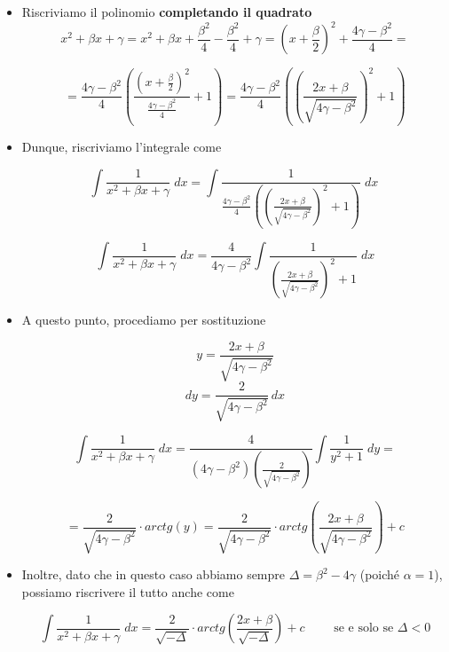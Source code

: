 \documentclass[a4paper, 12pt]{report}
\begin{document}
\begin{enumerate}
\begin{enumerate}
\begin{itemize}
                \item Riscriviamo il polinomio \textbf{completando il quadrato}
                \[ x^2 + \beta x + \gamma = x^2 + \beta x + \frac{\beta^2}{4} - \frac{\beta^2}{4} + \gamma = \left ( x + \frac{\beta}{2} \right )^2 + \frac{4 \gamma - \beta^2}{4} = \]
                
                \[ = \frac{4 \gamma - \beta^2}{4} \left ( \frac{ \left ( x + \frac{\beta}{2} \right )^2}{\frac{4 \gamma - \beta^2}{4}}  + 1 \right ) =
                \frac{4 \gamma - \beta^2}{4} \left ( \left ( \frac{2x+ \beta}{\sqrt{4 \gamma-\beta^2}} \right )^2  + 1 \right )\]
                
                    \item Dunque, riscriviamo l'integrale come
                    
                    \[ \int \frac{1}{x^2 + \beta x + \gamma} \; dx = \int \frac{1}{\frac{4 \gamma - \beta^2}{4} \left ( \left ( \frac{2x+ \beta}{\sqrt{4 \gamma-\beta^2}} \right )^2  + 1 \right )} \; dx\ \]
                    
                \[ \int \frac{1}{x^2 + \beta x + \gamma} \; dx = \frac{4}{4 \gamma - \beta^2} \int \frac{1}{\left (\frac{2x+ \beta}{\sqrt{4 \gamma-\beta^2}} \right )^2  + 1} \; dx \]
                
                \item A questo punto, procediamo per sostituzione
                
                \[ y = \frac{2x+ \beta}{\sqrt{4 \gamma-\beta^2}} \]
                \[ dy = \frac{2}{\sqrt{4 \gamma-\beta^2}} \, dx \]
                
                \[ \int \frac{1}{x^2 + \beta x + \gamma} \; dx = \frac{4}{(4 \gamma - \beta^2)\left ( \frac{2}{\sqrt{4 \gamma-\beta^2}} \right )} \int \frac{1}{y^2 + 1}\; dy= \]
                
                \[ = \frac{2}{\sqrt{4 \gamma - \beta^2}}  \cdot arctg(y) = \frac{2}{\sqrt{4 \gamma - \beta^2}} \cdot arctg \left ( \frac{2x+ \beta}{\sqrt{4 \gamma-\beta^2}}\right )+c\]
                
                \item Inoltre, dato che in questo caso abbiamo sempre $\Delta = \beta^2 - 4 \gamma$ (poiché $\alpha = 1$), possiamo riscrivere il tutto anche come
                
                \[ \int \frac{1}{x^2 + \beta x + \gamma} \; dx = \frac{2}{\sqrt{-\Delta}} \cdot arctg \left ( \frac{2x+ \beta}{\sqrt{-\Delta}}\right )+c \qquad \text{ se e solo se } \Delta < 0\]
                

\end{itemize}
\end{enumerate}
\end{enumerate}
\end{document}

